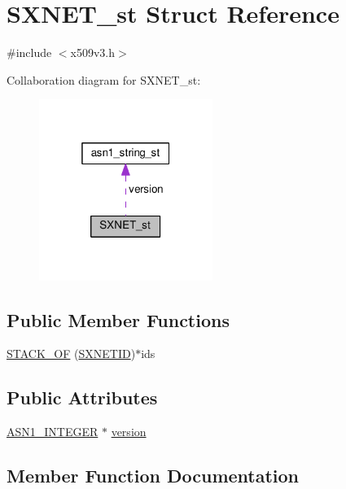 \hypertarget{struct_s_x_n_e_t__st}{}\section{S\+X\+N\+E\+T\+\_\+st Struct Reference}
\label{struct_s_x_n_e_t__st}


{\ttfamily \#include $<$x509v3.\+h$>$}



Collaboration diagram for S\+X\+N\+E\+T\+\_\+st\+:
\nopagebreak
\begin{figure}[H]
\begin{center}
\leavevmode
\includegraphics[width=160pt]{struct_s_x_n_e_t__st__coll__graph}
\end{center}
\end{figure}
\subsection*{Public Member Functions}
\begin{DoxyCompactItemize}
\item 
\hyperlink{struct_s_x_n_e_t__st_a8471b75a1f89aa7250dcd73ca5df3981}{S\+T\+A\+C\+K\+\_\+\+OF} (\hyperlink{x509v3_8h_a24fdf675662685173d32668916d5b361}{S\+X\+N\+E\+T\+ID})$\ast$ids
\end{DoxyCompactItemize}
\subsection*{Public Attributes}
\begin{DoxyCompactItemize}
\item 
\hyperlink{ossl__typ_8h_af4335399bf9774cb410a5e93de65998b}{A\+S\+N1\+\_\+\+I\+N\+T\+E\+G\+ER} $\ast$ \hyperlink{struct_s_x_n_e_t__st_ac542b59573e2c64e51f9bdfb49144526}{version}
\end{DoxyCompactItemize}


\subsection{Member Function Documentation}
